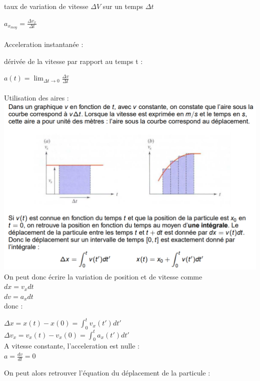 \documentclass[]{article}
\begin{document}
taux de variation de vitesse $\Delta V$ sur un temps $\Delta t$

$a_{x_{moy}} = \frac{\Delta v_x}{\Delta t}$\\\\
Acceleration instantanée :

dérivée de la vitesse par rapport au temps t :

$a(t) = \displaystyle \lim_{\Delta t \to 0}\frac{\Delta v}{\Delta  t}$\\\\
\newpage
Utilisation des aires :\\
\includegraphics[scale=0.65]{utilisation_aires}\\
On peut donc écrire la variation de position et de vitesse comme\\

$dx = v_xdt$\\

$dv = a_xdt$\\

donc :

\indent \indent $\Delta x = x(t) - x(0) = \displaystyle \int^t_0 v_x(t')dt'$\\

\indent \indent $\Delta v_x = v_x(t) - v_x(0) = \displaystyle \int^t_0 a_x(t')dt'$\\

A vitesse constante, l'acceleration est nulle :\\

\indent \indent $a = \frac{dv}{dt}=0$

On peut alors retrouver l'équation du déplacement de la particule :\\
\end{document}
